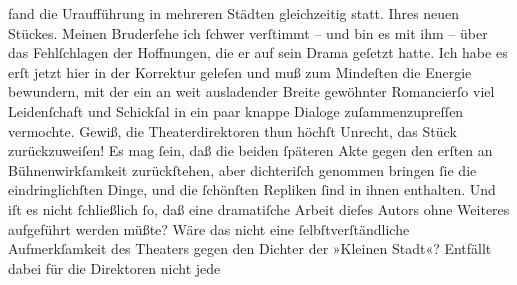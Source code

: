 \begin{ledgroupsized}[t]{13cm}
{{{                        fand die Uraufführung in mehreren Städten gleichzeitig statt.}}}\label{K_L02032_1h} Ihres
                    neuen Stückes. Meinen Bruderſehe ich ſchwer verſtimmt – und bin es mit ihm
                    – über das Fehlſchlagen der Hoffnungen, die er auf sein Drama geſetzt hatte. Ich habe es erſt
                    jetzt hier in der Korrektur geleſen und muß zum Mindeſten die Energie bewundern,
                    mit der ein an weit ausladender Breite gewöhnter Romancierſo viel Leidenſchaft und Schickſal in ein paar
                    knappe Dialoge zuſammenzupreſſen vermochte. Gewiß, die Theaterdirektoren thun
                        {\pb}höchſt Unrecht, das Stück zurückzuweiſen! Es mag
                    ſein, daß die beiden ſpäteren Akte gegen den erſten an Bühnenwirkſamkeit
                    zurückſtehen, aber dichteriſch genommen bringen ſie die eindringlichſten Dinge,
                    und die ſchönſten Repliken ſind in ihnen enthalten. Und iſt es nicht ſchließlich
                    ſo, daß eine dramatiſche Arbeit dieſes Autors ohne Weiteres aufgeführt werden müßte? Wäre
                    das nicht eine ſelbſtverſtändliche Aufmerkſamkeit des Theaters gegen den Dichter der »Kleinen Stadt«? Entfällt da{\pb}bei für die Direktoren nicht jede

\end{ledgroupsized}
